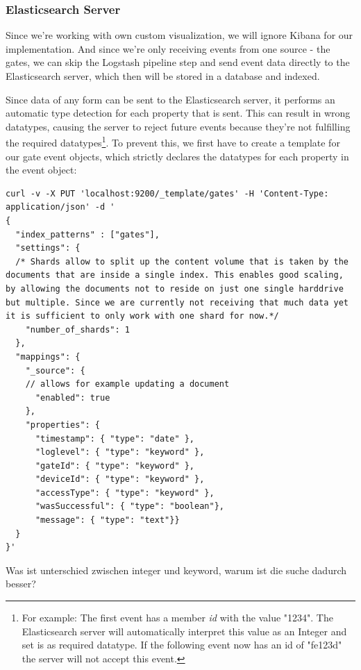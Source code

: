 \subsubsection{Elasticsearch Server}

Since we're working with own custom visualization, we will ignore Kibana for our implementation. And since we're only receiving events from one source - the gates, we can skip the Logstash pipeline step and send event data directly to the Elasticsearch server, which then will be stored in a database and indexed.

Since data of any form can be sent to the Elasticsearch server, it performs an automatic type detection for each property that is sent. This can result in wrong datatypes, causing the server to reject future events because they're not fulfilling the required datatypes\footnote{For example: The first event has a member \emph{id} with the value "1234". The Elasticsearch server will automatically interpret this value as an Integer and set is as required datatype. If the following event now has an id of "fe123d" the server will not accept this event.}. To prevent this, we first have to create a template for our gate event objects, which strictly declares the datatypes for each property in the event object:

\clearpage

\begin{lstlisting}[label=curlScriptTemplateElastic]
curl -v -X PUT 'localhost:9200/_template/gates' -H 'Content-Type: application/json' -d '
{
  "index_patterns" : ["gates"],
  "settings": {
  /* Shards allow to split up the content volume that is taken by the documents that are inside a single index. This enables good scaling, by allowing the documents not to reside on just one single harddrive but multiple. Since we are currently not receiving that much data yet it is sufficient to only work with one shard for now.*/
    "number_of_shards": 1
  },
  "mappings": {
    "_source": {
    // allows for example updating a document
      "enabled": true
    },
    "properties": {
      "timestamp": { "type": "date" },
      "loglevel": { "type": "keyword" },
      "gateId": { "type": "keyword" },
      "deviceId": { "type": "keyword" },
      "accessType": { "type": "keyword" },
      "wasSuccessful": { "type": "boolean"},
      "message": { "type": "text"}}
  }
}'
\end{lstlisting}

Was ist unterschied zwischen integer und keyword, warum ist die suche dadurch besser?

